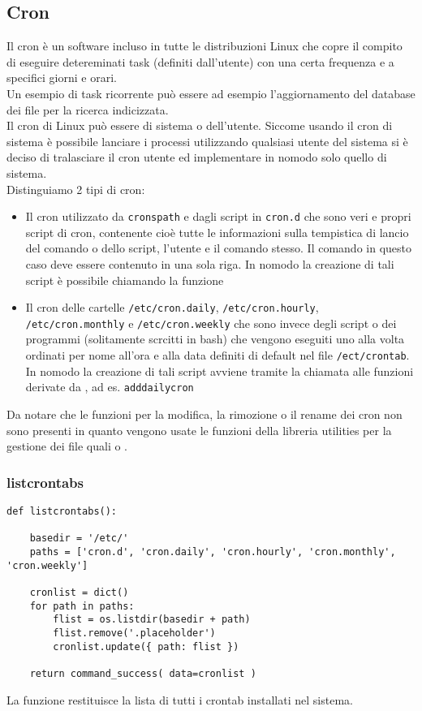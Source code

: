 \documentclass[11pt]{article}
\begin{document}
\subsection{Cron}\label{cron}
Il cron è un software incluso in tutte le distribuzioni Linux che copre il compito di eseguire
detereminati task (definiti dall'utente) con una certa frequenza e a specifici giorni e orari.\\
Un esempio di task ricorrente può essere ad esempio l'aggiornamento del database dei file per
la ricerca indicizzata.\\
Il cron di Linux può essere di sistema o dell'utente. Siccome usando il cron di sistema è possibile lanciare i processi
utilizzando qualsiasi utente del sistema si è deciso di tralasciare il cron utente ed implementare in nomodo
solo quello di sistema.\\
Distinguiamo 2 tipi di cron:
\begin{itemize}
	\item{Il cron utilizzato da \texttt{cronspath} e dagli script in \texttt{cron.d} che sono veri e propri
		script di cron, contenente cioè tutte le informazioni sulla tempistica di lancio del comando o
		dello script, l'utente e il comando stesso. Il comando in questo caso deve essere contenuto in una sola riga.
		In nomodo la creazione di tali script è possibile chiamando la funzione }
	\item{Il cron delle cartelle \texttt{/etc/cron.daily}, \texttt{/etc/cron.hourly}, \texttt{/etc/cron.monthly} e \texttt{/etc/cron.weekly}
		che sono invece degli script o dei programmi (solitamente scrcitti in bash) che vengono eseguiti uno
		alla volta ordinati per nome all'ora e alla data definiti di default nel file \texttt{/ect/crontab}.
		In nomodo la creazione di tali script avviene tramite la chiamata alle funzioni derivate da ,
		ad es. \texttt{adddailycron}}
\end{itemize}
Da notare che le funzioni per la modifica, la rimozione o il rename dei cron non sono presenti in quanto vengono usate le funzioni
della libreria utilities per la gestione dei file quali  o .

\subsubsection{listcrontabs}
\begin{lstlisting}
def listcrontabs():

    basedir = '/etc/'
    paths = ['cron.d', 'cron.daily', 'cron.hourly', 'cron.monthly', 'cron.weekly']

    cronlist = dict()
    for path in paths:
        flist = os.listdir(basedir + path)
        flist.remove('.placeholder') 
        cronlist.update({ path: flist })

    return command_success( data=cronlist )
\end{lstlisting}
La funzione restituisce la lista di tutti i crontab installati nel sistema.
\end{document}
